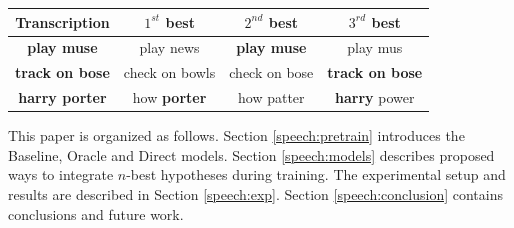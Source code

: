 



\begin{table}[t!]
	\label{tbl:expMotiv}
	\centering
		\begin{tabular}{|c|c|c|c|}
			\hline
			
			Transcription& $1^{st}$ best &$2^{nd}$ best&$3^{rd}$ best \\
			\hline
			\textbf{play muse}&play news&\textbf{play muse}&play mus\\
			\textbf{track on bose}&check on bowls& check on bose &\textbf{track on bose}\\
			\textbf{harry porter} & how \textbf{porter}& how patter&\textbf{harry} power\\
			\hline
			
		\end{tabular}
		

\end{table}


This paper is organized as follows. Section \ref{speech:pretrain} introduces the Baseline, Oracle and Direct models. Section \ref{speech:models} describes proposed ways to integrate $n$-best hypotheses during training. The experimental setup and results are described in Section \ref{speech:exp}. Section \ref{speech:conclusion} contains conclusions and future work.


